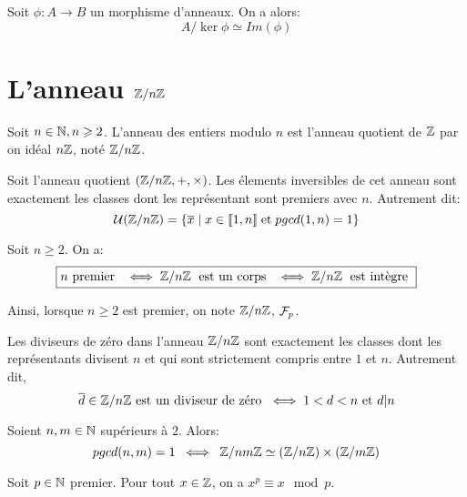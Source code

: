 \begin{theorem}[Isomorphisme]
    Soit $\phi : A \longrightarrow B$ un morphisme d'anneaux. On a alors: 
        \[ \boxed{A/\ker \phi \simeq Im(\phi)} \] 
\end{theorem}


\section{L'anneau $\Z/n\Z$}

\begin{definition}[Anneau $\Z/n\Z$]
    Soit $n \in \mathbb{N}, n \geqslant 2$. L'anneau des entiers modulo $n$ est l'anneau quotient de $\mathbb{Z}$ par on idéal $n\mathbb{Z}$, noté $\Z/n\Z$. 
\end{definition}

\begin{theorem}
    Soit l'anneau quotient $(\mathbb{Z}/n\mathbb{Z}, +,\times)$. Les élements inversibles de cet anneau sont exactement les classes 
    dont les représentant sont premiers avec $n$. Autrement dit: 
        \[ \mathcal{U}(\mathbb{Z}/n\mathbb{Z}) = \{\overline{x} \; | \; x \in \llbracket 1, n \rrbracket \; \text{et} \; pgcd(1,n) = 1\} \] 
\end{theorem}

\begin{theorem}[Fondamental]
    Soit $n \geqslant 2$. On a: 
        \[ \boxed{n \text{ premier } \; \iff \mathbb{Z}/n\mathbb{Z} \; \text{ est un corps } \; \iff \mathbb{Z}/n\mathbb{Z} \; \text{ est intègre }} \] 
\end{theorem}

Ainsi, lorsque $n \geqslant 2$ est premier, on note $\Z/n\Z$, $\mathcal{F}_p$. 

\begin{proposition}
    Les diviseurs de zéro dans l'anneau $\Z/n\Z$ sont exactement les classes dont les représentants divisent $n$ 
    et qui sont strictement compris entre $1$ et $n$. 
    Autrement dit, 
        \[ \overline{d} \in \mathbb{Z}/n\mathbb{Z} \text{ est un diviseur de zéro } \iff 1 < d < n \text{ et } d|n \] 
\end{proposition}

\begin{theorem}[Chinois]
    Soient $n,m \in \mathbb{N}$ supérieurs à $2$. Alors: 
        \[ pgcd(n,m) = 1 \; \iff \; \mathbb{Z}/nm\mathbb{Z} \simeq (\mathbb{Z}/n\mathbb{Z}) \times (\mathbb{Z}/m\mathbb{Z}) \] 
\end{theorem}

\begin{theorem}
    Soit $p \in \mathbb{N}$ premier. Pour tout $x \in \mathbb{Z}$, on a $x^p \equiv x \mod p$. 
\end{theorem}

